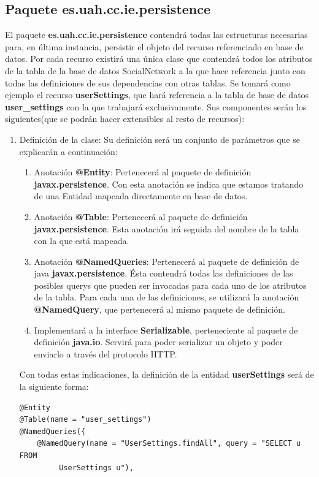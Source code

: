 \subsection{Paquete es.uah.cc.ie.persistence}
El paquete \textbf{es.uah.cc.ie.persistence} contendrá todas las estructuras necesarias para, en última instancia, persistir el objeto del recurso referenciado en base de datos. Por cada recurso existirá una única clase que contendrá todos los atributos de la tabla de la base de datos SocialNetwork a la que hace referencia junto con todas las definiciones de sus dependencias con otras tablas. Se tomará como ejemplo el recurso \textbf{userSettings}, que hará referencia a la tabla de base de datos \textbf{user\_settings} con la que trabajará exclusivamente. Sus componentes serán los siguientes(que se podrán hacer extensibles al resto de recursos):
\begin{enumerate}
\item Definición de la clase: Su definición será un conjunto de parámetros que se explicarán a continuación:
\begin{enumerate}
\item Anotación \textbf{@Entity}: Pertenecerá al paquete de definición \textbf{javax.persistence}. Con esta anotación se indica que estamos tratando de una Entidad mapeada directamente en base de datos.
\item Anotación \textbf{@Table}: Pertenecerá al paquete de definición \textbf{javax.persistence}. Esta anotación irá seguida del nombre de la tabla con la que está mapeada.
\item Anotación \textbf{@NamedQueries}: Pertenecerá al paquete de definición de java \textbf{javax.persistence}. Ésta contendrá todas las definiciones de las posibles querys que pueden ser invocadas para cada uno de los atributos de la tabla. Para cada una de las definiciones, se utilizará la anotación \textbf{@NamedQuery}, que pertenecerá al mismo paquete de definición.
\item Implementará a la interface \textbf{Serializable}, perteneciente al paquete de definición \textbf{java.io}. Servirá para poder serializar un objeto y poder enviarlo a través del protocolo HTTP.
\end{enumerate}
Con todas estas indicaciones, la definición de la entidad \textbf{userSettings} será de la siguiente forma:
\begin{verbatim}
@Entity
@Table(name = "user_settings")
@NamedQueries({
    @NamedQuery(name = "UserSettings.findAll", query = "SELECT u FROM 
         UserSettings u"),

\end{verbatim}
\end{enumerate}
